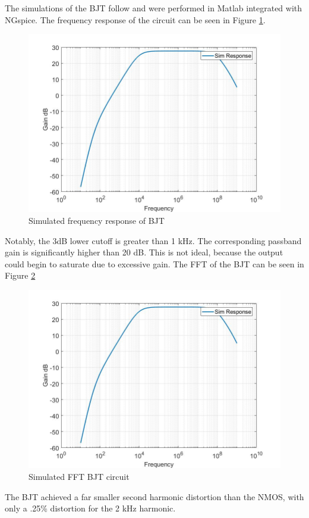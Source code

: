  
 The simulations of the BJT follow and were performed in Matlab integrated with NGspice. The frequency response of the circuit can be seen in Figure \ref{fig:bjtsimfreq}. 

\begin{figure}[H]
	\centering
	\includegraphics[width=.55\textwidth]{CircuitDevelopment/BJT_bandwidth.jpg}
	\caption{Simulated frequency response of BJT}
	\label{fig:bjtsimfreq}
\end{figure}

Notably, the 3dB lower cutoff is greater than 1 kHz. The corresponding passband gain is significantly higher than 20 dB. This is not ideal, because the output could begin to saturate due to excessive gain. The FFT of the BJT can be seen in Figure \ref{fig:bjtFFT}

\begin{figure}[H]
	\centering
	\includegraphics[width=.55\textwidth]{CircuitDevelopment/BJT_bandwidth.jpg}
	\caption{Simulated FFT BJT circuit}
	\label{fig:bjtFFT}
\end{figure}

The BJT achieved a far smaller second harmonic distortion than the NMOS, with only a .25\% distortion for the 2 kHz harmonic.



 



